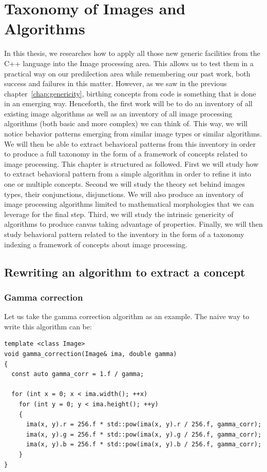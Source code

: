 \chapter{Taxonomy of Images and Algorithms}
\label{chap:image.algorithms.taxonomy}

In this thesis, we researches how to apply all those new generic facilities from the C++ language into the Image
processing area. This allows us to test them in a practical way on our predilection area while remembering our past
work, both success and failures in this matter. However, as we saw in the previous chapter~\ref{chap:genericity},
birthing concepts from code is something that is done in an emerging way. Henceforth, the first work will be to do an
inventory of all existing image algorithms as well as an inventory of all image processing algorithms (both basic and
more complex) we can think of. This way, we will notice behavior patterns emerging from similar image types or similar
algorithms. We will then be able to extract behavioral patterns from this inventory in order to produce a full taxonomy
in the form of a framework of concepts related to image processing. This chapter is structured as followed. First we
will study how to extract behavioral pattern from a simple algorithm in order to refine it into one or multiple
concepts. Second we will study the theory set behind images types, their conjunctions, disjunctions. We will also
produce an inventory of image processing algorithms limited to mathematical morphologies that we can leverage for the
final step. Third, we will study the intrinsic genericity of algorithms to produce canvas taking advantage of
properties. Finally, we will then study behavioral pattern related to the inventory in the form of a taxonomy indexing a
framework of concepts about image processing.

\section{Rewriting an algorithm to extract a concept}
\label{sec:rewriting}

\subsection{Gamma correction}
\label{subsec:gamma}

Let us take the gamma correction algorithm as an example. The naive way to write this algorithm can be:

\begin{verbatim}
template <class Image>
void gamma_correction(Image& ima, double gamma)
{
  const auto gamma_corr = 1.f / gamma;

  for (int x = 0; x < ima.width(); ++x)
    for (int y = 0; y < ima.height(); ++y)
    {
      ima(x, y).r = 256.f * std::pow(ima(x, y).r / 256.f, gamma_corr);
      ima(x, y).g = 256.f * std::pow(ima(x, y).g / 256.f, gamma_corr);
      ima(x, y).b = 256.f * std::pow(ima(x, y).b / 256.f, gamma_corr);
    }
}
\end{verbatim}

